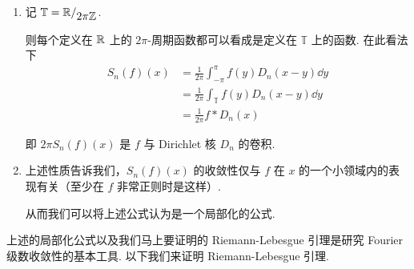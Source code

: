 \begin{hint}
    \begin{enumerate}
        \item 记 $\mathbb{T}=\mathbb{R}/_{\displaystyle 2\pi\mathbb{Z}}$.
        
        则每个定义在 $\mathbb{R}$ 上的 $2\pi$-周期函数都可以看成是定义在 $\mathbb{T}$ 上的函数. 在此看法下
$$
\begin{aligned}
    S_n(f)(x)&=\frac{1}{2\pi}\int_{-\pi}^\pi f(y)D_n(x-y)\dd y\\
    &=\frac{1}{2\pi}\int_{\mathbb{T}}f(y)D_n(x-y)\dd y\\
    &=\frac{1}{2\pi}f*D_n(x)
\end{aligned}
$$

        即 $2\pi S_n(f)(x)$ 是 $f$ 与 Dirichlet 核 $D_n$ 的卷积.

        \item 上述性质告诉我们，$S_n(f)(x)$ 的收敛性仅与 $f$ 在 $x$ 的一个小领域内的表现有关（至少在 $f$ 非常正则时是这样）.
        
        从而我们可以将上述公式认为是一个局部化的公式.
    \end{enumerate}
\end{hint}


上述的局部化公式以及我们马上要证明的 Riemann-Lebesgue 引理是研究 Fourier 级数收敛性的基本工具. 以下我们来证明 Riemann-Lebesgue 引理.

